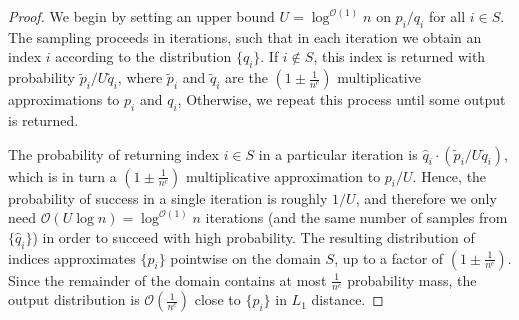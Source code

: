 \begin{proof}
We begin by setting an upper bound $U = \log^{\mathcal O(1)}n$ on $p_i/q_i$ for all $i\in S$.
The sampling proceeds in iterations, such that in each iteration we obtain an index $i$ according to the distribution $\{ \hat q_i\}$.
If $i\not\in S$, this index is returned with probability $\tilde p_i/U\tilde q_i$,
where $\tilde p_i$ and $\tilde q_i$ are the $\left( 1\pm \frac{1}{n^c} \right)$ multiplicative approximations to $p_i$ and $q_i$,
Otherwise, we repeat this process until some output is returned.

The probability of returning index $i\in S$ in a particular iteration is $\hat q_i\cdot (\tilde p_i/U \tilde q_i)$,
which is in turn a $\left( 1\pm \frac{1}{n^c} \right)$ multiplicative approximation to $p_i/U$.
Hence, the probability of success in a single iteration is roughly $1/U$,
and therefore we only need $\mathcal O(U\log n) = \log^{\mathcal O(1)}n$ iterations (and the same number of samples from $\{ \hat q_i\}$)
in order to succeed with high probability.
The resulting distribution of indices approximates $\{ p_i\}$ pointwise on the domain $S$, up to a factor of $\left( 1\pm \frac{1}{n^c} \right)$.
Since the remainder of the domain contains at most $ \frac{1}{n^c}$ probability mass,
the output distribution is $\mathcal O\left(\frac{1}{n^c}\right)$ close to $\{ p_i\}$ in $L_1$ distance.
\end{proof}
